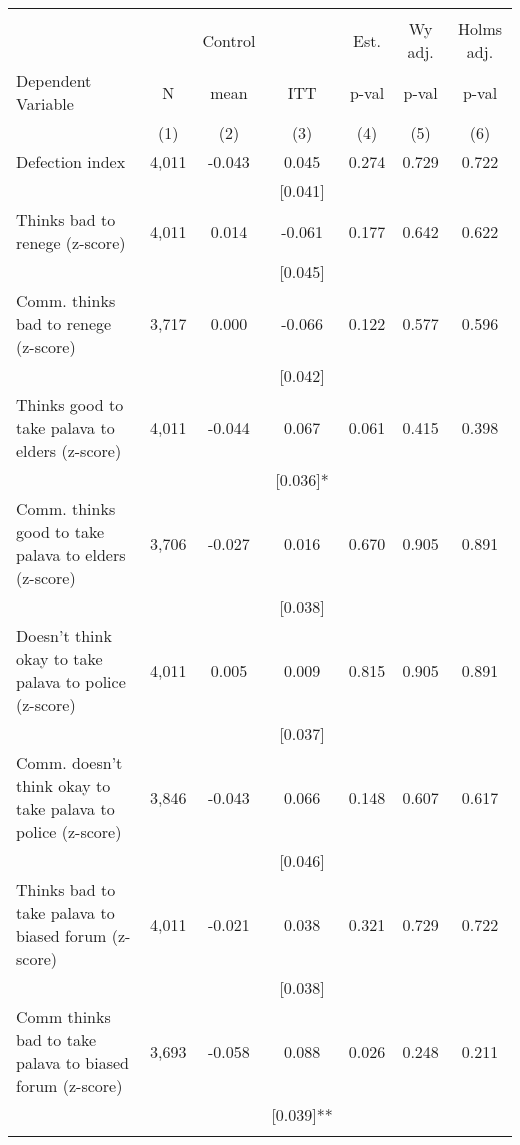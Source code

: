 \begin{tabular}{lcccccc}
\hline \noalign{\smallskip} &  &  &  &  &  & \\
 &  & Control &  & Est. & Wy adj. & Holms adj.\\
Dependent Variable & N & mean & ITT & p-val & p-val & p-val\\
 & (1) & (2) & (3) & (4) & (5) & (6)\\
\noalign{\smallskip}\hline \noalign{\smallskip}\quad Defection index & 4,011 & -0.043 & 0.045 & 0.274 & 0.729 & 0.722\\
 &  &  & [0.041] &  &  & \\
\quad Thinks bad to renege (z-score) & 4,011 & 0.014 & -0.061 & 0.177 & 0.642 & 0.622\\
 &  &  & [0.045] &  &  & \\
\quad Comm. thinks bad to renege (z-score) & 3,717 & 0.000 & -0.066 & 0.122 & 0.577 & 0.596\\
 &  &  & [0.042] &  &  & \\
\quad Thinks good to take palava to elders (z-score) & 4,011 & -0.044 & 0.067 & 0.061 & 0.415 & 0.398\\
 &  &  & [0.036]* &  &  & \\
\quad Comm. thinks good to take palava to elders (z-score) & 3,706 & -0.027 & 0.016 & 0.670 & 0.905 & 0.891\\
 &  &  & [0.038] &  &  & \\
\quad Doesn't think okay to take palava to police (z-score) & 4,011 & 0.005 & 0.009 & 0.815 & 0.905 & 0.891\\
 &  &  & [0.037] &  &  & \\
\quad Comm. doesn't think okay to take palava to police (z-score) & 3,846 & -0.043 & 0.066 & 0.148 & 0.607 & 0.617\\
 &  &  & [0.046] &  &  & \\
\quad Thinks bad to take palava to biased forum (z-score) & 4,011 & -0.021 & 0.038 & 0.321 & 0.729 & 0.722\\
 &  &  & [0.038] &  &  & \\
\quad Comm thinks bad to take palava to biased forum (z-score) & 3,693 & -0.058 & 0.088 & 0.026 & 0.248 & 0.211\\
 &  &  & [0.039]** &  &  & \\
\noalign{\smallskip}\hline\end{tabular}
